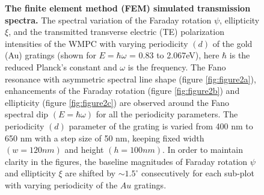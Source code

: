 \documentclass[13pt]{article}
\begin{document}
\begin{figure}[hbt]
\begin{subfigure}[]{.49\linewidth}
		\caption{}
		\label{fig:figure2d}
	\end{subfigure}
	\caption{\textbf{The finite element method (FEM) simulated transmission spectra.} The spectral variation of the Faraday rotation $\psi$, ellipticity $\xi$, and the transmitted transverse electric (TE) polarization intensities of the WMPC with varying periodicity $(d)$ of the gold (Au) gratings (shown for $E=\hbar \omega$ = 0.83 to 2.067eV), here $\hbar$ is the reduced Planck’s constant and $\omega$ is the frequency. The Fano resonance with asymmetric spectral line shape (figure \ref{fig:figure2a}), enhancements of the Faraday rotation  (figure \ref{fig:figure2b}) and ellipticity (figure \ref{fig:figure2c}) are observed around the Fano spectral dip $(E=\hbar \omega)$ for all the periodicity parameters. The periodicity $(d)$ parameter of the grating is varied from 400 nm to 650 nm with a step size of 50 nm, keeping fixed width $(w = 120 nm)$ and height $(h = 100 nm)$. In order to maintain clarity in the figures, the baseline magnitudes of Faraday rotation $\psi$ and ellipticity $\xi$ are shifted by $ \sim 1.5^{\circ}$ consecutively for each sub-plot with varying periodicity of the $Au$ gratings.}
	\label{fig:figure2}
\end{figure}
\end{document}
